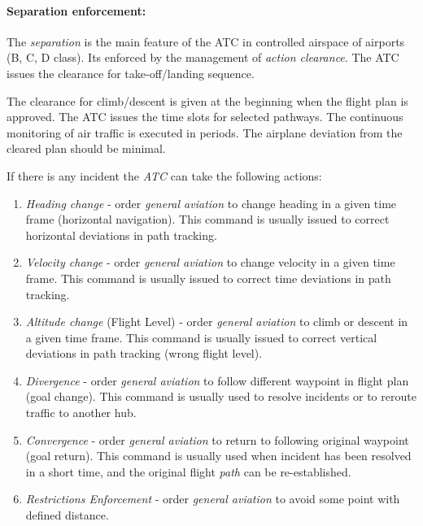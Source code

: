 \paragraph{Separation enforcement:} The \emph{separation} is the main feature of the ATC in controlled airspace of airports (B, C, D class). Its enforced by the management of \emph{action clearance}. The ATC issues the clearance for take-off/landing sequence. 

The clearance for climb/descent is given at the beginning when the flight plan is approved. The ATC issues the time slots for selected pathways. The continuous monitoring of air traffic is executed in periods. The airplane deviation from the cleared plan should be minimal. 

If there is any incident the \emph{ATC} can take the following actions:
\begin{enumerate}
    
    \item \emph{Heading change} - order \emph{general aviation} to change heading in a given time frame (horizontal navigation). This command is usually issued to correct horizontal deviations in path tracking.
    
    \item \emph{Velocity change} - order \emph{general aviation} to change velocity in a given time frame. This command is usually issued to correct time deviations in path tracking.
    
    \item \emph{Altitude change} (Flight Level) - order \emph{general aviation} to climb or descent in a given time frame. This command is usually issued to correct vertical deviations in path tracking (wrong flight level).
    
    \item \emph{Divergence} - order \emph{general aviation} to follow different waypoint in flight plan (goal change). This command is usually used to resolve incidents or to reroute traffic to another hub.
    
    \item \emph{Convergence} - order \emph{general aviation} to return to following original waypoint (goal return). This command is usually used when incident has been resolved in a short time, and the original flight \emph{path} can be re-established.
    
    \item \emph{Restrictions Enforcement} - order \emph{general aviation} to avoid some point with defined distance.  
\end{enumerate}

